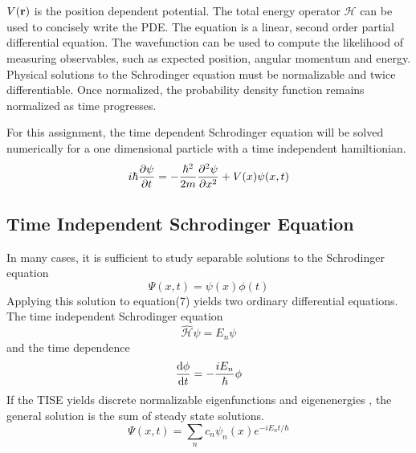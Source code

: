 \documentclass[twoside,twocolumn]{article}
\begin{document}
$V(\vb{r})$ is the position dependent potential. The total energy operator
$\hat{\mathcal{H}}$ can be used to concisely write the PDE.
The equation is a linear, second order partial differential equation. 
The wavefunction can be used to compute the likelihood of measuring  observables, such as expected position, angular momentum and energy. Physical solutions to the Schrodinger equation must be normalizable and twice differentiable. Once normalized, the probability density function remains normalized as time progresses.

For this assignment, the time dependent Schrodinger equation will be solved numerically for a one dimensional particle with a time independent hamiltionian. 
\begin{equation}
	i\hbar \pdv{\psi}{t} = -\frac{\hbar ^2}{2 m} \pdv[2]{\psi}{x} + V(x) \psi(x,t)
\end{equation}
\subsection{Time Independent Schrodinger Equation}
In many cases, it is sufficient to study separable solutions to the Schrodinger equation
\begin{equation}
	\Psi(x,t) = \psi(x)\phi(t)
\end{equation}
Applying this solution to equation(7) yields two ordinary differential equations. The time independent Schrodinger equation 
\begin{equation}
	\hat{\mathcal{H}}\psi = E_n \psi
\end{equation}
and the time dependence
\begin{equation}
	\dv{\phi}{t} = - \frac{iE_n}{\hbar} \phi
	\label{time}
\end{equation}
If the TISE yields discrete normalizable eigenfunctions and eigenenergies , the general solution is the sum of steady state solutions.
\begin{equation}
	\Psi(x,t) = \sum_n c_n\psi_n(x)e^{-iE_n t / \hbar}
	\label{sum}
\end{equation}
	

\end{document}
